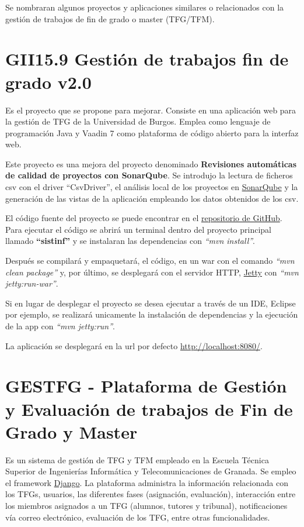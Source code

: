 Se nombraran algunos proyectos y aplicaciones similares o relacionados con la gestión de trabajos de fin de grado o master (TFG/TFM). 

\section{GII15.9 Gestión de trabajos fin de grado v2.0}
Es el proyecto que se propone para mejorar. Consiste en una aplicación web para la gestión de TFG de la Universidad de Burgos. Emplea como lenguaje de programación Java y Vaadin 7 como plataforma de código abierto para la interfaz web. 

Este proyecto es una mejora del proyecto denominado \textbf{Revisiones automáticas de calidad de proyectos con SonarQube}. Se introdujo la lectura de ficheros csv con el driver ``CsvDriver'', el análisis local de los proyectos en \href{https://www.sonarqube.org/}{SonarQube} y la generación de las vistas de la aplicación empleando los datos obtenidos de los csv.

El código fuente del proyecto se puede encontrar en el \href{https://github.com/jfb0019/Gestor-TFG-2016}{repositorio de GitHub}. Para ejecutar el código se abrirá un terminal dentro del proyecto principal llamado \textbf{``sistinf''} y se instalaran las dependencias con \emph{``mvn install''}. 

Después se compilará y empaquetará, el código, en un war con el comando \emph{``mvn clean package''} y, por último, se desplegará con el servidor HTTP, \href{https://www.eclipse.org/jetty/}{Jetty} con \emph{``mvn jetty:run-war''}. 

Si en lugar de desplegar el proyecto se desea ejecutar a través de un IDE, Eclipse por ejemplo, se realizará unicamente la instalación de dependencias y la ejecución de la app con \emph{``mvn jetty:run''}.

La aplicación se desplegará en la url por defecto \href{http://localhost:8080/}{http://localhost:8080/}.

\section{GESTFG - Plataforma de Gestión y Evaluación de trabajos de Fin de Grado y Master}
Es un sistema de gestión de TFG y TFM empleado en la Escuela Técnica Superior de Ingenierías Informática y Telecomunicaciones de Granada. Se empleo el framework \href{https://www.djangoproject.com/}{Django}. La plataforma administra la información relacionada con los TFGs, usuarios, las diferentes fases (asignación, evaluación), interacción entre los miembros asignados a un TFG (alumnos, tutores y tribunal), notificaciones vía correo electrónico, evaluación de los TFG, entre otras funcionalidades.

